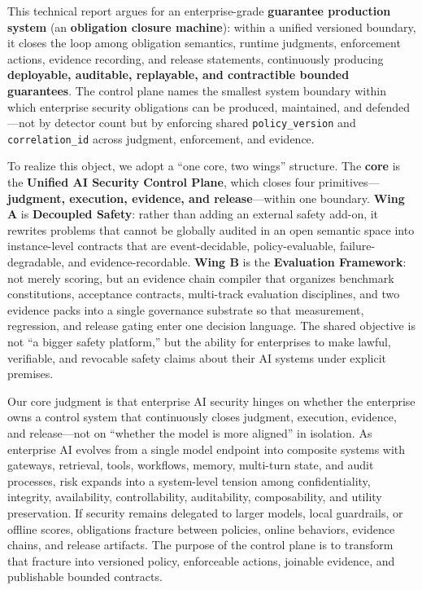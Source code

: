 \documentclass[11pt,a4paper]{report}
\begin{document}
\makebluebookfrontmatter

\begin{bluebookabstract}
This technical report argues for an enterprise-grade \textbf{guarantee production system} (an \textbf{obligation closure machine}): within a unified versioned boundary, it closes the loop among obligation semantics, runtime judgments, enforcement actions, evidence recording, and release statements, continuously producing \textbf{deployable, auditable, replayable, and contractible bounded guarantees}. The control plane names the smallest system boundary within which enterprise security obligations can be produced, maintained, and defended—not by detector count but by enforcing shared \texttt{policy\_version} and \texttt{correlation\_id} across judgment, enforcement, and evidence.

To realize this object, we adopt a “one core, two wings” structure. The \textbf{core} is the \textbf{Unified AI Security Control Plane}, which closes four primitives—\textbf{judgment, execution, evidence, and release}—within one boundary. \textbf{Wing A} is \textbf{Decoupled Safety}: rather than adding an external safety add-on, it rewrites problems that cannot be globally audited in an open semantic space into instance-level contracts that are event-decidable, policy-evaluable, failure-degradable, and evidence-recordable. \textbf{Wing B} is the \textbf{Evaluation Framework}: not merely scoring, but an evidence chain compiler that organizes benchmark constitutions, acceptance contracts, multi-track evaluation disciplines, and two evidence packs into a single governance substrate so that measurement, regression, and release gating enter one decision language. The shared objective is not “a bigger safety platform,” but the ability for enterprises to make lawful, verifiable, and revocable safety claims about their AI systems under explicit premises.

Our core judgment is that enterprise AI security hinges on whether the enterprise owns a control system that continuously closes judgment, execution, evidence, and release—not on ``whether the model is more aligned'' in isolation. As enterprise AI evolves from a single model endpoint into composite systems with gateways, retrieval, tools, workflows, memory, multi-turn state, and audit processes, risk expands into a system-level tension among confidentiality, integrity, availability, controllability, auditability, composability, and utility preservation. If security remains delegated to larger models, local guardrails, or offline scores, obligations fracture between policies, online behaviors, evidence chains, and release artifacts. The purpose of the control plane is to transform that fracture into versioned policy, enforceable actions, joinable evidence, and publishable bounded contracts.


\end{bluebookabstract}
\end{document}
